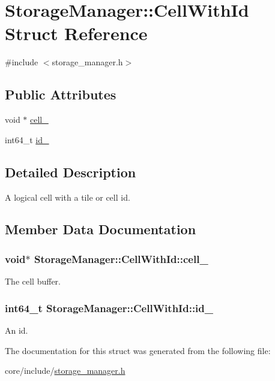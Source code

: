 \hypertarget{structStorageManager_1_1CellWithId}{}\section{Storage\+Manager\+:\+:Cell\+With\+Id Struct Reference}
\label{structStorageManager_1_1CellWithId}


{\ttfamily \#include $<$storage\+\_\+manager.\+h$>$}

\subsection*{Public Attributes}
\begin{DoxyCompactItemize}
\item 
void $\ast$ \hyperlink{structStorageManager_1_1CellWithId_aba208df2ad29728e5426ed6f57c81e0a}{cell\+\_\+}
\item 
int64\+\_\+t \hyperlink{structStorageManager_1_1CellWithId_abf49f20fcf42edffc115158bbbc64411}{id\+\_\+}
\end{DoxyCompactItemize}


\subsection{Detailed Description}
A logical cell with a tile or cell id. 

\subsection{Member Data Documentation}
\hypertarget{structStorageManager_1_1CellWithId_aba208df2ad29728e5426ed6f57c81e0a}{}
\subsubsection[{cell\+\_\+}]{\setlength{\rightskip}{0pt plus 5cm}void$\ast$ Storage\+Manager\+::\+Cell\+With\+Id\+::cell\+\_\+}\label{structStorageManager_1_1CellWithId_aba208df2ad29728e5426ed6f57c81e0a}
The cell buffer. \hypertarget{structStorageManager_1_1CellWithId_abf49f20fcf42edffc115158bbbc64411}{}
\subsubsection[{id\+\_\+}]{\setlength{\rightskip}{0pt plus 5cm}int64\+\_\+t Storage\+Manager\+::\+Cell\+With\+Id\+::id\+\_\+}\label{structStorageManager_1_1CellWithId_abf49f20fcf42edffc115158bbbc64411}
An id. 

The documentation for this struct was generated from the following file\+:\begin{DoxyCompactItemize}
\item 
core/include/\hyperlink{storage__manager_8h}{storage\+\_\+manager.\+h}\end{DoxyCompactItemize}
